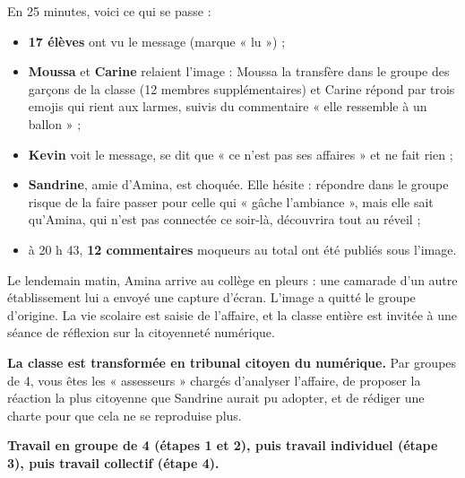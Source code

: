 \documentclass[11pt]{article}
\newcounter{popsec}
\newcounter{popsub}
\newcommand{\courssub}[1]{%
  \stepcounter{popsub}%
  \par\vspace{9pt}\noindent{\popxbold\fontsize{11.5}{13}\selectfont\color{popink}{\color{poporange}\thepopsec.\thepopsub}\hspace{6pt}#1}\par\nopagebreak\vspace{4pt}
}
\begin{document}
En 25 minutes, voici ce qui se passe :

\begin{itemize}
\item \textbf{17 élèves} ont vu le message (marque « lu ») ;
\item \textbf{Moussa} et \textbf{Carine} relaient l'image : Moussa la transfère dans le groupe des garçons de la classe (12 membres supplémentaires) et Carine répond par trois emojis qui rient aux larmes, suivis du commentaire « elle ressemble à un ballon » ;
\item \textbf{Kevin} voit le message, se dit que « ce n'est pas ses affaires » et ne fait rien ;
\item \textbf{Sandrine}, amie d'Amina, est choquée. Elle hésite : répondre dans le groupe risque de la faire passer pour celle qui « gâche l'ambiance », mais elle sait qu'Amina, qui n'est pas connectée ce soir-là, découvrira tout au réveil ;
\item à 20 h 43, \textbf{12 commentaires} moqueurs au total ont été publiés sous l'image.
\end{itemize}

Le lendemain matin, Amina arrive au collège en pleurs : une camarade d'un autre établissement lui a envoyé une capture d'écran. L'image a quitté le groupe d'origine. La vie scolaire est saisie de l'affaire, et la classe entière est invitée à une séance de réflexion sur la citoyenneté numérique.

\textbf{La classe est transformée en tribunal citoyen du numérique.} Par groupes de 4, vous êtes les « assesseurs » chargés d'analyser l'affaire, de proposer la réaction la plus citoyenne que Sandrine aurait pu adopter, et de rédiger une charte pour que cela ne se reproduise plus.

\courssub{Consignes}

\textbf{Travail en groupe de 4 (étapes 1 et 2), puis travail individuel (étape 3), puis travail collectif (étape 4).}
\end{document}
